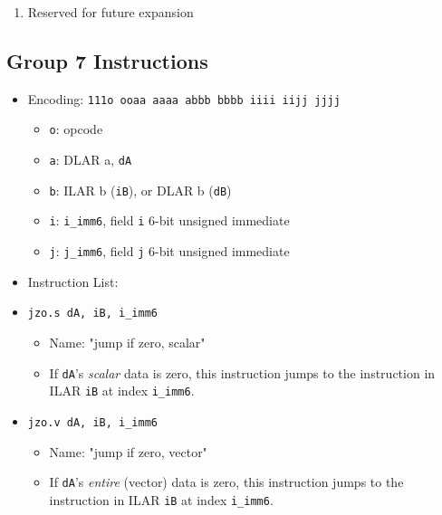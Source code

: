 \documentclass{article}
\begin{document}
\begin{itemize}
\begin{enumerate}
			\item Reserved for future expansion
			\end{enumerate}
		\end{itemize}

	\subsection{Group 7 Instructions}
		\begin{itemize}
		\item Encoding:  \texttt{111o ooaa aaaa abbb  bbbb iiii iijj jjjj}
			\begin{itemize}
			\item \texttt{o}:  opcode
			\item \texttt{a}:  DLAR a, \texttt{dA}
			\item \texttt{b}:  ILAR b (\texttt{iB}), or DLAR b
				(\texttt{dB})
			\item \texttt{i}:  \texttt{i\_imm6}, field \texttt{i} 6-bit
				unsigned immediate
			\item \texttt{j}:  \texttt{j\_imm6}, field \texttt{j} 6-bit
				unsigned immediate
			\end{itemize}
		\item Instruction List:
			\item \texttt{jzo.s dA, iB, i\_imm6}
				\begin{itemize}
				\item Name:  "jump if zero, scalar"
				\item If \texttt{dA}'s \textit{scalar} data is zero, this
					instruction jumps to the instruction in ILAR
					\texttt{iB} at index \texttt{i\_imm6}.
				\end{itemize}
			\item \texttt{jzo.v dA, iB, i\_imm6}
				\begin{itemize}
				\item Name:  "jump if zero, vector"
				\item If \texttt{dA}'s \textit{entire} (vector) data is
					zero, this instruction jumps to the instruction in ILAR
					\texttt{iB} at index \texttt{i\_imm6}.
				\end{itemize}


\end{itemize}
\end{document}
